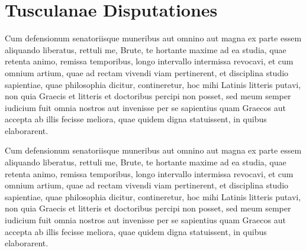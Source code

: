 \documentclass[11pt,b5paper,twoside]{book}
\begin{document}
\beginnumbering
\numberpstarttrue
{}

\chapter*{Tusculanae Disputationes}

\pstart{}%
%
Cum defensionum  senatoriisque muneribus aut omnino aut magna ex parte essem aliquando liberatus, rettuli me, Brute, te hortante maxime ad ea studia, quae retenta animo, remissa temporibus, longo intervallo intermissa revocavi, et cum omnium artium, quae ad rectam vivendi viam pertinerent,  et disciplina studio sapientiae, quae philosophia dicitur, contineretur, hoc mihi Latinis litteris  putavi, non quia  Graecis et litteris et doctoribus percipi non posset, sed meum semper iudicium fuit omnia nostros aut invenisse per se sapientius quam Graecos aut accepta ab illis fecisse meliora, quae quidem digna statuissent, in quibus elaborarent.
\pend

\pstart%
Cum defensionum  senatoriisque muneribus aut omnino aut magna ex parte essem aliquando liberatus, rettuli me, Brute, te hortante maxime ad ea studia, quae retenta animo, remissa temporibus, longo intervallo intermissa revocavi, et cum omnium artium, quae ad rectam vivendi viam pertinerent,  et disciplina studio sapientiae, quae philosophia dicitur, contineretur, hoc mihi Latinis litteris  putavi, non quia  Graecis et litteris et doctoribus percipi non posset, sed meum semper iudicium fuit omnia nostros aut invenisse per se sapientius quam Graecos aut accepta ab illis fecisse meliora, quae quidem digna statuissent, in quibus elaborarent.
\pend

\numberpstartfalse
\endnumbering

\newpage
\end{document}
